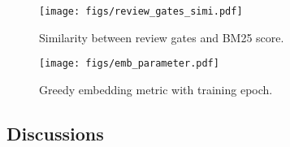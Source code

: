 \begin{figure}[htbp]
\begin{minipage}[t]{0.49\linewidth}
    \texttt{[image: figs/review\_gates\_simi.pdf]}
    \vspace{-7mm}
    \caption{Similarity between review gates and BM25 score.}
    \label{fig:review_gates_simi}
\end{minipage}\vspace{-2mm}
    \hfill \begin{minipage}[t]{0.49\linewidth}
    \texttt{[image: figs/emb\_parameter.pdf]}
    \vspace{-7mm}
    \caption{Greedy embedding metric with training epoch.}
    \label{fig:parameter_test}
\end{minipage} 
\vspace{-2mm}
\end{figure}
\vspace{-2mm}

\subsection{Discussions}


